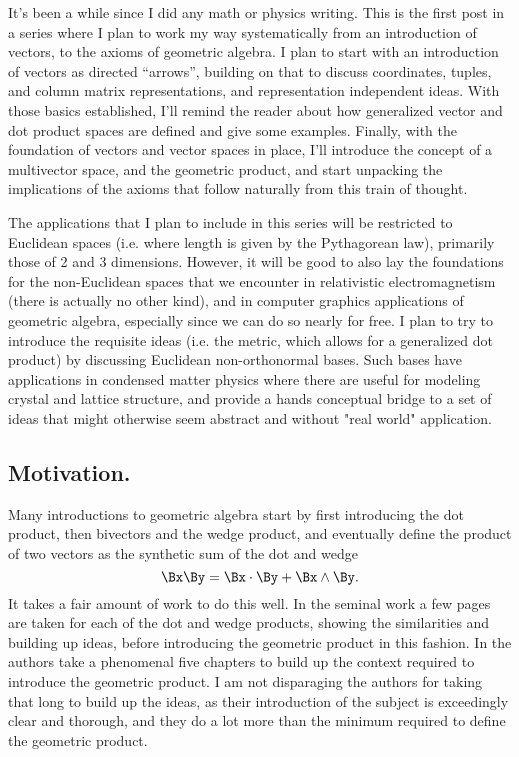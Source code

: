 It's been a while since I did any math or physics writing.
This is the first post in a series where I plan to work my way systematically from an introduction of vectors, to the axioms of geometric algebra.
I plan to start with an introduction of vectors as directed ``arrows'', building on that to discuss coordinates, tuples, and column matrix representations, and representation independent ideas.
With those basics established, I'll remind the reader about how generalized vector and dot product spaces are defined and give some examples.
Finally, with the foundation of vectors and vector spaces in place, I'll introduce the concept of a multivector space, and the geometric product, and start unpacking the implications of the axioms that follow naturally from this train of thought.

The applications that I plan to include in this series will be restricted to Euclidean spaces (i.e. where length is given by the Pythagorean law), primarily those of 2 and 3 dimensions.
However, it will be good to also lay the foundations for the non-Euclidean spaces that we encounter in relativistic electromagnetism (there is actually no other kind), and in computer graphics applications of geometric algebra, especially since we can do so nearly for free.
I plan to try to introduce the requisite ideas (i.e. the metric, which allows for a generalized dot product) by discussing Euclidean non-orthonormal bases.
Such bases have applications in condensed matter physics where there are useful for modeling crystal and lattice structure, and provide a hands conceptual bridge to a set of ideas that might otherwise seem abstract and without "real world" application.

\subsection{Motivation.}
Many introductions to geometric algebra start by first introducing the dot product, then bivectors and the wedge product, and eventually define the product of two vectors as the synthetic sum of the dot and wedge
\begin{equation}\label{eqn:inthepipe:20}
\Bx \By = \Bx \cdot \By + \Bx \wedge \By.
\end{equation}
It takes a fair amount of work to do this well.
In the seminal work \citep{hestenes1999nfc} a few pages are taken for each of the dot and wedge products, showing the similarities and building up ideas, before introducing the geometric product in this fashion.
In \citep{dorst2007gac} the authors take a phenomenal five chapters to build up the context required to introduce the geometric product.
I am not disparaging the authors for taking that long to build up the ideas, as their introduction of the subject is exceedingly clear and thorough, and they do a lot more than the minimum required to define the geometric product.

